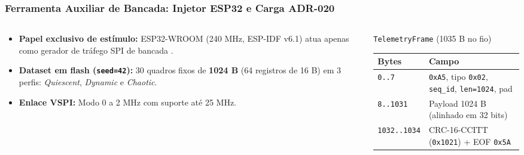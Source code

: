 \begin{frame}
  \frametitle{Ferramenta Auxiliar de Bancada: Injetor ESP32 e Carga ADR-020}
  \begin{columns}[T]
    \begin{column}{.50\textwidth}
      \begin{itemize}
        \item \textbf{Papel exclusivo de est\'imulo:} ESP32-WROOM (240 MHz, ESP-IDF v6.1) atua apenas como gerador de tr\'afego SPI de bancada \autocite{EspressifESPIDF}.
        \item \textbf{Dataset em flash (\texttt{seed=42}):} 30 quadros fixos de \textbf{1024 B} (64 registros de 16 B) em 3 perfis: \textit{Quiescent}, \textit{Dynamic} e \textit{Chaotic}.
        \item \textbf{Enlace VSPI:} Modo 0 a 2 MHz com suporte at\'e 25 MHz.
      \end{itemize}
    \end{column}
    \begin{column}{.46\textwidth}
      \begin{block}{\texttt{TelemetryFrame} (1035 B no fio)}
        \scriptsize
        \begin{tabular}{@{}lp{.64\linewidth}@{}}
          \toprule
          \textbf{Bytes} & \textbf{Campo}\\
          \midrule
          \texttt{0..7} & \texttt{0xA5}, tipo \texttt{0x02}, \texttt{seq\_id}, \texttt{len=1024}, pad\\
          \texttt{8..1031} & Payload 1024 B (alinhado em 32 bits)\\
          \texttt{1032..1034} & CRC-16-CCITT (\texttt{0x1021}) + EOF \texttt{0x5A}\\
          \bottomrule
        \end{tabular}
      \end{block}
    \end{column}
  \end{columns}
\end{frame}
